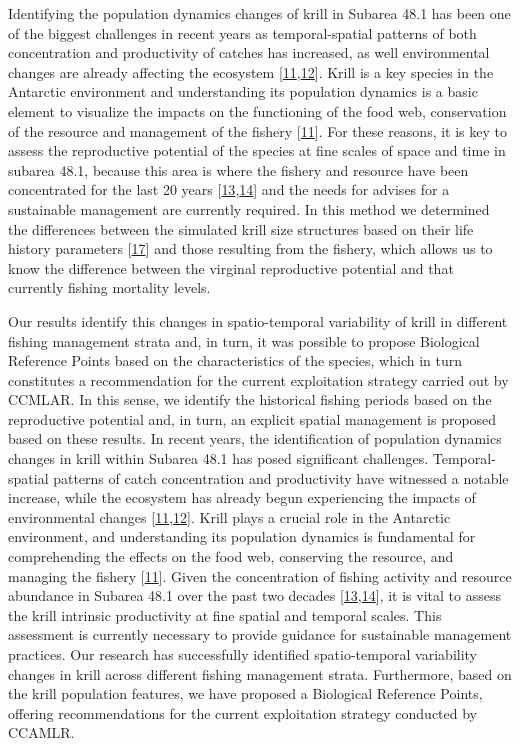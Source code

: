 \documentclass[
]{article}
\begin{document}
Identifying the population dynamics changes of krill in Subarea 48.1 has
been one of the biggest challenges in recent years as temporal-spatial
patterns of both concentration and productivity of catches has
increased, as well environmental changes are already affecting the
ecosystem
{[}\protect\hyperlink{ref-Hill2016}{11},\protect\hyperlink{ref-McBride2021}{12}{]}.
Krill is a key species in the Antarctic environment and understanding
its population dynamics is a basic element to visualize the impacts on
the functioning of the food web, conservation of the resource and
management of the fishery {[}\protect\hyperlink{ref-Hill2016}{11}{]}.
For these reasons, it is key to assess the reproductive potential of the
species at fine scales of space and time in subarea 48.1, because this
area is where the fishery and resource have been concentrated for the
last 20 years
{[}\protect\hyperlink{ref-Atkinson2022}{13},\protect\hyperlink{ref-SantaCruz2022}{14}{]}
and the needs for advises for a sustainable management are currently
required. In this method we determined the differences between the
simulated krill size structures based on their life history parameters
{[}\protect\hyperlink{ref-Maschette2020}{17}{]} and those resulting from
the fishery, which allows us to know the difference between the virginal
reproductive potential and that currently fishing mortality levels.

Our results identify this changes in spatio-temporal variability of
krill in different fishing management strata and, in turn, it was
possible to propose Biological Reference Points based on the
characteristics of the species, which in turn constitutes a
recommendation for the current exploitation strategy carried out by
CCMLAR. In this sense, we identify the historical fishing periods based
on the reproductive potential and, in turn, an explicit spatial
management is proposed based on these results. In recent years, the
identification of population dynamics changes in krill within Subarea
48.1 has posed significant challenges. Temporal-spatial patterns of
catch concentration and productivity have witnessed a notable increase,
while the ecosystem has already begun experiencing the impacts of
environmental changes
{[}\protect\hyperlink{ref-Hill2016}{11},\protect\hyperlink{ref-McBride2021}{12}{]}.
Krill plays a crucial role in the Antarctic environment, and
understanding its population dynamics is fundamental for comprehending
the effects on the food web, conserving the resource, and managing the
fishery {[}\protect\hyperlink{ref-Hill2016}{11}{]}. Given the
concentration of fishing activity and resource abundance in Subarea 48.1
over the past two decades
{[}\protect\hyperlink{ref-Atkinson2022}{13},\protect\hyperlink{ref-SantaCruz2022}{14}{]},
it is vital to assess the krill intrinsic productivity at fine spatial
and temporal scales. This assessment is currently necessary to provide
guidance for sustainable management practices. Our research has
successfully identified spatio-temporal variability changes in krill
across different fishing management strata. Furthermore, based on the
krill population features, we have proposed a Biological Reference
Points, offering recommendations for the current exploitation strategy
conducted by CCAMLR.
\end{document}
